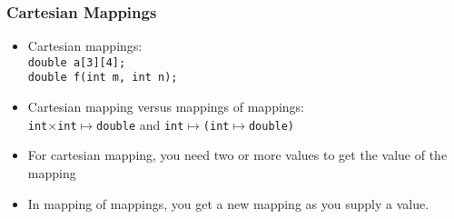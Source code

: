 \begin{frame}
\frametitle{Cartesian Mappings}
 \begin{itemize}
  \item Cartesian mappings:\\
	\texttt{double a[3][4];}\\
	\texttt{double f(int m, int n);}
  \item Cartesian mapping versus mappings of mappings:\\
   	\texttt{int$\times$int$\mapsto$double} and \texttt{int$\mapsto$(int$\mapsto$double)}
  \item For cartesian mapping, you need two or more values to get the value of the mapping
  \item In mapping of mappings, you get a new mapping as you supply a value.
 \end{itemize}
\end{frame}


